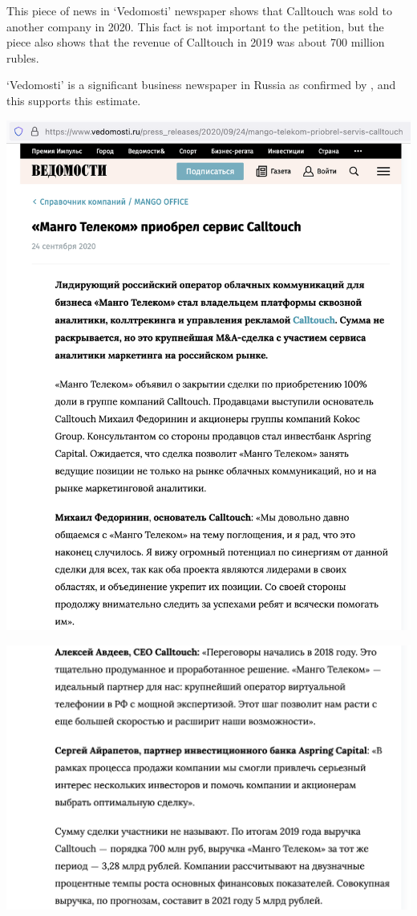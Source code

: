 
This piece of news in `Vedomosti' newspaper shows that Calltouch was sold to another company in 2020.
This fact is not important to the petition, but the piece also shows that the revenue of Calltouch
in 2019 was about 700 million rubles.

`Vedomosti' is a significant business newspaper in Russia as confirmed by ,
and this supports this estimate.



\includegraphics[width=\textwidth]{calltouch-sold-vedomosti-p1}
\WillContinue

\pagebreak

\Continuing
\includegraphics[width=\textwidth]{calltouch-sold-vedomosti-p2}

\pagebreak
